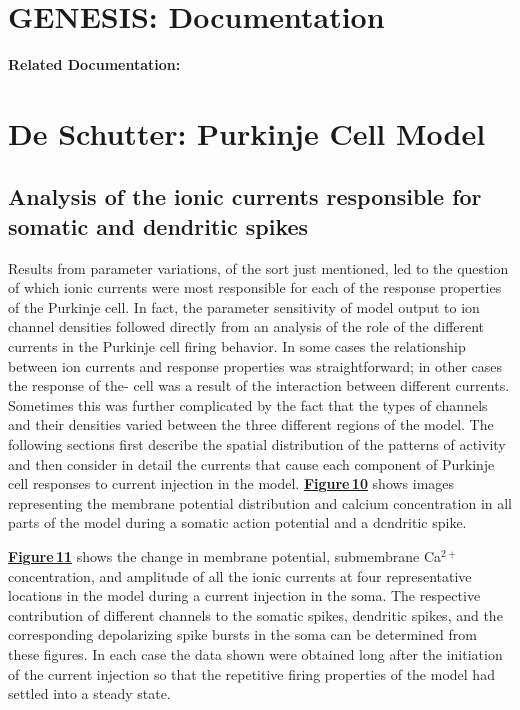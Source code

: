 \documentclass[12pt]{article}
\begin{document}
\section*{GENESIS: Documentation}

{\bf Related Documentation:}

\section*{De Schutter: Purkinje Cell Model}

\subsection*{Analysis of the ionic currents responsible for somatic and dendritic spikes}

Results from parameter variations, of the sort just mentioned,
led to the question of which ionic currents were
most responsible for each of the response properties of the
Purkinje cell. In fact, the parameter sensitivity of model
output to ion channel densities followed directly from an
analysis of the role of the different currents in the Purkinje
cell firing behavior. In some cases the relationship between
ion currents and response properties was straightforward;
in other cases the response of the- cell was a result of the
interaction between different currents. Sometimes this was
further complicated by the fact that the types of channels
and their densities varied between the three different regions
of the model. The following sections first describe the
spatial distribution of the patterns of activity and then consider
in detail the currents that cause each component of
Purkinje cell responses to current injection in the model.
\href{../pub-purkinje-deschutter1-fig-10/pub-purkinje-deschutter1-fig-10.tex}{\bf Figure\,10} shows images representing the membrane potential
distribution and calcium concentration in all parts
of the model during a somatic action potential and a dcndritic
spike.

\href{../pub-purkinje-deschutter1-fig-11/pub-purkinje-deschutter1-fig-11.tex}{\bf Figure\,11} shows the change in membrane potential,
submembrane Ca$^{2+}$ concentration, and amplitude
of all the ionic currents at four representative locations in
the model during a current injection in the soma. The respective
contribution of different channels to the somatic
spikes, dendritic spikes, and the corresponding depolarizing
spike bursts in the soma can be determined from these figures.
In each case the data shown were obtained long after
the initiation of the current injection so that the repetitive
firing properties of the model had settled into a steady state.



\end{document}
